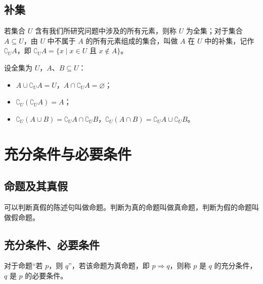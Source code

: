\documentclass[lang=cn,newtx,10pt,scheme=chinese,nofont]{elegantbook}
\begin{document}
\subsection{补集}
\begin{definition}[全集与补集]
若集合 $U$ 含有我们所研究问题中涉及的所有元素，则称 $U$ 为全集；对于集合 $A \subseteq U$，由 $U$ 中不属于 $A$ 的所有元素组成的集合，叫做 $A$ 在 $U$ 中的补集，记作 $\complement_U A$，即 $\complement_U A = \{x \mid x \in U \text{ 且 } x \notin A\}$。
\end{definition}
\begin{theorem}
设全集为 $U$，$A$、$B \subseteq U$：
\begin{itemize}
    \item $A \cup \complement_U A=U$，$A \cap \complement_U A=\varnothing$；
    \item $\complement_U(\complement_U A)=A$；
    \item $\complement_U(A \cup B)=\complement_U A \cap \complement_U B$，$\complement_U(A \cap B)=\complement_U A \cup \complement_U B$。
\end{itemize}
\end{theorem}

\section{充分条件与必要条件}
\subsection{命题及其真假}
\begin{definition}[命题]
可以判断真假的陈述句叫做命题。判断为真的命题叫做真命题，判断为假的命题叫做假命题。
\end{definition}
\subsection{充分条件、必要条件}
\begin{definition}[充分条件与必要条件]
对于命题“若 $p$，则 $q$”，若该命题为真命题，即 $p \Rightarrow q$，则称 $p$ 是 $q$ 的充分条件，$q$ 是 $p$ 的必要条件。
\end{definition}
\end{document}
